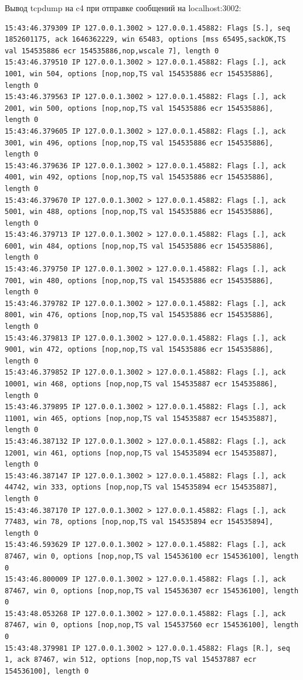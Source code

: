 \documentclass[a4paper,12pt]{article}
\begin{document}
Вывод tcpdump на c4 при отправке сообщений на localhost:3002:
\begin{Verbatim}
15:43:46.379309 IP 127.0.0.1.3002 > 127.0.0.1.45882: Flags [S.], seq 1852601175, ack 1646362229, win 65483, options [mss 65495,sackOK,TS val 154535886 ecr 154535886,nop,wscale 7], length 0
15:43:46.379510 IP 127.0.0.1.3002 > 127.0.0.1.45882: Flags [.], ack 1001, win 504, options [nop,nop,TS val 154535886 ecr 154535886], length 0
15:43:46.379563 IP 127.0.0.1.3002 > 127.0.0.1.45882: Flags [.], ack 2001, win 500, options [nop,nop,TS val 154535886 ecr 154535886], length 0
15:43:46.379605 IP 127.0.0.1.3002 > 127.0.0.1.45882: Flags [.], ack 3001, win 496, options [nop,nop,TS val 154535886 ecr 154535886], length 0
15:43:46.379636 IP 127.0.0.1.3002 > 127.0.0.1.45882: Flags [.], ack 4001, win 492, options [nop,nop,TS val 154535886 ecr 154535886], length 0
15:43:46.379670 IP 127.0.0.1.3002 > 127.0.0.1.45882: Flags [.], ack 5001, win 488, options [nop,nop,TS val 154535886 ecr 154535886], length 0
15:43:46.379713 IP 127.0.0.1.3002 > 127.0.0.1.45882: Flags [.], ack 6001, win 484, options [nop,nop,TS val 154535886 ecr 154535886], length 0
15:43:46.379750 IP 127.0.0.1.3002 > 127.0.0.1.45882: Flags [.], ack 7001, win 480, options [nop,nop,TS val 154535886 ecr 154535886], length 0
15:43:46.379782 IP 127.0.0.1.3002 > 127.0.0.1.45882: Flags [.], ack 8001, win 476, options [nop,nop,TS val 154535886 ecr 154535886], length 0
15:43:46.379813 IP 127.0.0.1.3002 > 127.0.0.1.45882: Flags [.], ack 9001, win 472, options [nop,nop,TS val 154535886 ecr 154535886], length 0
15:43:46.379852 IP 127.0.0.1.3002 > 127.0.0.1.45882: Flags [.], ack 10001, win 468, options [nop,nop,TS val 154535887 ecr 154535886], length 0
15:43:46.379895 IP 127.0.0.1.3002 > 127.0.0.1.45882: Flags [.], ack 11001, win 465, options [nop,nop,TS val 154535887 ecr 154535887], length 0
15:43:46.387132 IP 127.0.0.1.3002 > 127.0.0.1.45882: Flags [.], ack 12001, win 461, options [nop,nop,TS val 154535894 ecr 154535887], length 0
15:43:46.387147 IP 127.0.0.1.3002 > 127.0.0.1.45882: Flags [.], ack 44742, win 333, options [nop,nop,TS val 154535894 ecr 154535887], length 0
15:43:46.387170 IP 127.0.0.1.3002 > 127.0.0.1.45882: Flags [.], ack 77483, win 78, options [nop,nop,TS val 154535894 ecr 154535894], length 0
15:43:46.593629 IP 127.0.0.1.3002 > 127.0.0.1.45882: Flags [.], ack 87467, win 0, options [nop,nop,TS val 154536100 ecr 154536100], length 0
15:43:46.800009 IP 127.0.0.1.3002 > 127.0.0.1.45882: Flags [.], ack 87467, win 0, options [nop,nop,TS val 154536307 ecr 154536100], length 0
15:43:48.053268 IP 127.0.0.1.3002 > 127.0.0.1.45882: Flags [.], ack 87467, win 0, options [nop,nop,TS val 154537560 ecr 154536100], length 0
15:43:48.379981 IP 127.0.0.1.3002 > 127.0.0.1.45882: Flags [R.], seq 1, ack 87467, win 512, options [nop,nop,TS val 154537887 ecr 154536100], length 0
\end{Verbatim}
\end{document}
